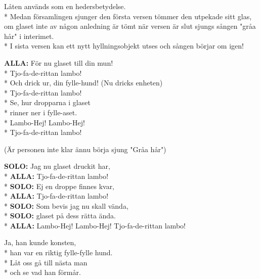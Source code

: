 \begin{SongText}[Lambo]
    \begin{SongInfo}
        Låten används som en hedersbetydelse.\\*%
        Medan församlingen sjunger den första versen tömmer den utpekade sitt glas, om glaset inte av någon anledning är tömt när versen är slut sjungs sången "gråa hår" i interimet.\\*%
        I sista versen kan ett nytt hyllningsobjekt utses och sången börjar om igen!
    \end{SongInfo}
    \begin{SongVerse}
        \textbf{ALLA:} För nu glaset till din mun!\\*%
        Tjo-fa-de-rittan lambo!\\*%
        Och drick ur, din fylle-hund! (Nu dricks enheten)\\*%
        Tjo-fa-de-rittan lambo!\\*%
        Se, hur dropparna i glaset \\*%
        rinner ner i fylle-aset.\\*%
        Lambo-Hej! Lambo-Hej!\\*%
        Tjo-fa-de-rittan lambo!
    \end{SongVerse}
    \begin{SongVerse}
        (Är personen inte klar ännu börja sjung "Gråa hår")
    \end{SongVerse}
    \begin{SongVerse}
        \textbf{SOLO:} Jag nu glaset druckit har,\\*%
        \textbf{ALLA:} Tjo-fa-de-rittan lambo!\\*%
        \textbf{SOLO:} Ej en droppe finnes kvar,\\*%
        \textbf{ALLA:} Tjo-fa-de-rittan lambo!\\*%
        \textbf{SOLO:} Som bevis jag nu skall vända,\\*%
        \textbf{SOLO:} glaset på dess rätta ända.\\*%
        \textbf{ALLA:} Lambo-Hej! Lambo-Hej! Tjo-fa-de-rittan lambo!
    \end{SongVerse}
    \begin{SongVerse}
        Ja, han kunde konsten,\\*%
        han var en riktig fylle-fylle hund.\\*%
        Låt oss gå till nästa man\\*%
        och se vad han förmår.
    \end{SongVerse}
\end{SongText}
